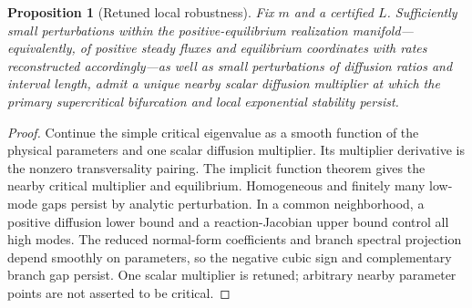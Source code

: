 \documentclass[11pt]{article}
\newif\ifsiadsreview
\newtheorem{proposition}[theorem]{Proposition}
\theoremstyle{definition}
\newcommand{\1}{\mathbf 1}
\begin{document}
\begin{table}[t]
\centering
\small
\ifsiadsreview
\setlength{\tabcolsep}{4.75pt}%
\fi

\caption{Current-profile diagnostics generated from one exact source.
$\chi_D^{\rm unit}$ is the current unit-equilibrium stable-profile contrast;
$\chi_D^{\rm scale}$ and $\chi_H^{\rm scale}$ are the physical contrasts at
the certified square-root-scaling endpoint; ``product'' is their exact product
$23(91(m-2)-1)/63$; ``lower'' is $\sqrt{8(m-2)}$; and $\eta_m$, $c_m$, and
$\sqrt{-\eta_m/c_m}$ use the current unit-profile normal-form convention.
The identity $\chi_D^{\rm unit}=\chi_D^{\rm scale}\chi_H^{\rm scale}$ is
exact, not a numerical coincidence.  The table is illustrative and proves no
all-dimensional claim.}
\label{tab:finite}
\end{table}

\begin{proposition}[Retuned local robustness]\label{prop:robust}
Fix $m$ and a certified $L$.  Sufficiently small perturbations within the
positive-equilibrium realization manifold---equivalently, of positive steady
fluxes and equilibrium coordinates with rates reconstructed accordingly---as
well as small perturbations of diffusion ratios and interval length, admit a
unique nearby scalar diffusion multiplier at which the primary supercritical
bifurcation and local exponential stability persist.
\end{proposition}

\begin{proof}
Continue the simple critical eigenvalue as a smooth function of the physical
parameters and one scalar diffusion multiplier.  Its multiplier derivative is
the nonzero transversality pairing.  The implicit function theorem gives the
nearby critical multiplier and equilibrium.  Homogeneous and finitely many
low-mode gaps persist by analytic perturbation.  In a common neighborhood,
a positive diffusion lower bound and a reaction-Jacobian upper bound control
all high modes.  The reduced normal-form coefficients and branch spectral
projection depend smoothly on parameters, so the negative cubic sign and
complementary branch gap persist.  One scalar multiplier is retuned; arbitrary
nearby parameter points are not asserted to be critical.
\end{proof}
\end{document}
